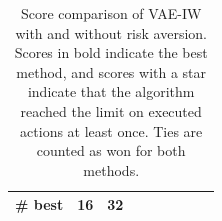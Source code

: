 \begin{table}[ht]
\begin{center}
\begin{small}
\begin{tabular}{lrrrrrrrl}
\midrule

\# best & 16 &  32 \\

\bottomrule

\end{tabular}
\end{small}
\end{center}
\caption{Score  comparison  of  VAE-IW  with  and  without risk aversion. Scores in bold indicate the best method, and scores with a star indicate that the algorithm reached the limit on executed actions at least once. Ties are counted as won for both methods. } 
\label{tab:atari-ra_no-ra}
\end{table}

